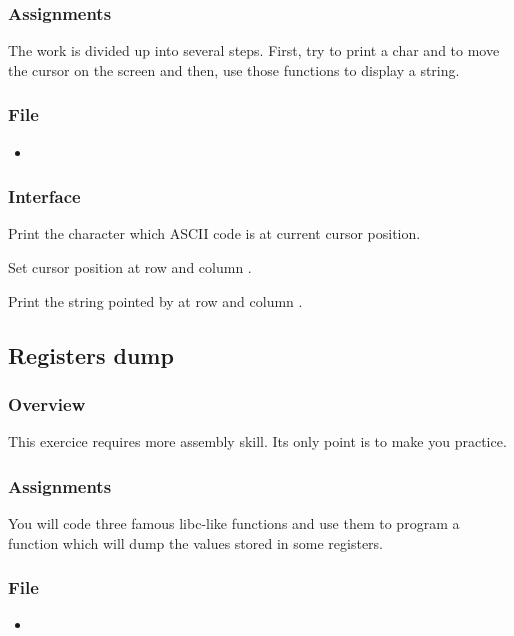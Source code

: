 \subsubsection*{Assignments}
The work is divided up into several steps. First, try to print a char and
to move the cursor on the screen and then, use those functions to display
a string.

\subsubsection*{File}
\begin{itemize}
  \item {}
\end{itemize}

\subsubsection*{Interface}
{
  Print the character which ASCII code is  at current cursor
  position.
}

{
  Set cursor position at row  and column .
}

{
  Print the string pointed by  at row  and
  column .
}

%
%

\newpage

\subsection{Registers dump}

\subsubsection*{Overview}
This exercice requires more assembly skill. Its only point is to make you
practice.

\subsubsection*{Assignments}
You will code three famous libc-like functions and use them to program
a function which will dump the values stored in some registers.

\subsubsection*{File}
\begin{itemize}
  \item {}
\end{itemize}

